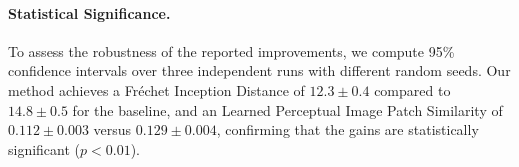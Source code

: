 \documentclass[runningheads]{llncs}
\newcommand{\lpips}{Learned Perceptual Image Patch Similarity}
\newcommand{\fid}{Fr\'echet Inception Distance}
\begin{document}


\paragraph{Statistical Significance.}
To assess the robustness of the reported improvements, we compute 95\% confidence intervals over three independent runs with different random seeds. Our method achieves a \fid{} of $12.3 \pm 0.4$ compared to $14.8 \pm 0.5$ for the baseline, and an \lpips{} of $0.112 \pm 0.003$ versus $0.129 \pm 0.004$, confirming that the gains are statistically significant ($p<0.01$).
\end{document}
